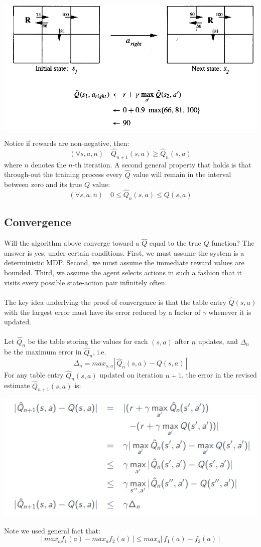\begin{center}
    \includegraphics[scale=0.9]{images/Q-learning-ex.png}
\end{center}
Notice if rewards are non-negative, then:
\[(\forall s, a, n) \quad \hat{Q}_{n+1}(s,a) \geq \hat{Q}_n (s,a)\]
where $n$ denotes the $n$-th iteration. A second general property that holds is that through-out the training process every $\hat{Q}$ value will remain in the interval between zero and its true $Q$ value:
\[(\forall s, a, n) \quad 0 \leq \hat{Q}_n (s,a) \leq Q(s,a)\]

\subsection{Convergence}
Will the algorithm above  converge toward a $\hat{Q}$ equal to the true $Q$ function? The answer is yes, under certain conditions. First, we must assume the system is a deterministic MDP. Second, we must assume the immediate reward values are bounded. Third, we assume the agent selects actions in such a fashion that it  visits every possible state-action pair infinitely often.\\\\
The key idea underlying the proof of convergence is that the table entry $\hat{Q}(s,a)$ with the largest error must have its error reduced by a factor of $\gamma$ whenever it is updated.\\\\
Let $\hat{Q}_n$ be the table storing the values for each $(s,a)$ after $n$ updates, and $\Delta_n$ be the maximum error in $\hat{Q}_n$, i.e.
\[\Delta_n = max_{s,a}|\,\hat{Q}_n(s,a) - Q(s,a)\,|\]
For any table entry $\hat{Q}_n(s, a)$ updated on iteration $n + 1$, the error in the revised estimate $\hat{Q}_{n+1}(s, a)$ is:
\begin{center}
    \includegraphics[]{images/Q-learning-conv-proof.png}
\end{center}
Note we used general fact that:
\[|\,max_a f_1(a) - max_a f_2(a)\,| \leq max_a|\,f_1(a) - f_2(a)\,|\]

